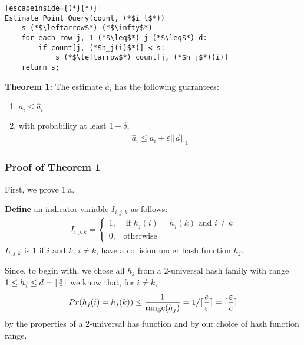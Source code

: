 \documentclass[11pt]{article}
\DeclarePairedDelimiter\ceil{\lceil}{\rceil}
\begin{document}
\begin{lstlisting}[escapeinside={(*}{*)}]
Estimate_Point_Query(count, (*$i_t$*)) 
    s (*$\leftarrow$*) (*$\infty$*)
    for each row j, 1 (*$\leq$*) j (*$\leq$*) d:
        if count[j, (*$h_j(i)$*)] < s:
            s (*$\leftarrow$*) count[j, (*$h_j$*)(i)]
    return s;
\end{lstlisting}

\textbf{Theorem 1:} The estimate $\hat a_i$ has the following guarantees:
\begin{enumerate}[label=\textnormal{(\arabic*)}]
    \item $a_i \leq \hat{a}_i$
    \item with probability at least $1 - \delta$, 
    \begin{align}
        \hat{a}_i \leq a_i + \varepsilon ||\vec{a}||_1 
    \end{align}
\end{enumerate}
\subsubsection{Proof of Theorem 1}
First, we prove 1.a.  

\textbf{Define} an indicator variable $I_{i, j, k}$ as follows:
\begin{align}
    I_{i, j, k} = 
    \begin{cases}
        1, & \text{ if } h_j(i) = h_j(k) \text{ and } i \neq k \\
        0, & \text{otherwise}
    \end{cases}
\end{align}
$I_{i, j, k}$ is 1 if $i$ and $k$, $i \neq k$, have a collision under hash function $h_j$.

Since, to begin with, we chose all $h_j$ from a 2-universal hash family
with range $1 \leq h_j \leq d = \ceil{\frac{e}{\varepsilon}}$ 
we know that, for $i \neq k$,
\begin{align}\label{eq:collision-prob}
    Pr(h_j(i) = h_j(k)) \leq \frac{1}{\text{range}(h_j)} = 1/\ceil{\frac{e}{\varepsilon}} = \ceil{\frac{\varepsilon}{e}}
\end{align}
by the properties of a 2-universal has function and by our choice of hash function
range.
\end{document}
